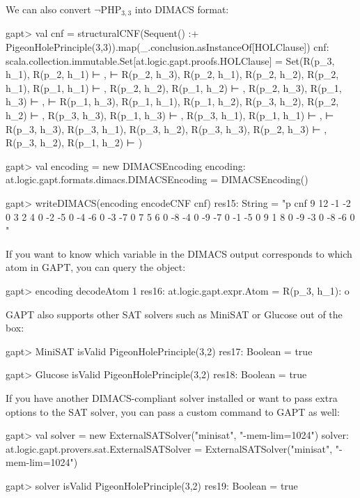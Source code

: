 \documentclass[a4paper,11pt]{article}
\newcommand{\cli}[1]{{\ttfamily {#1}}}
\begin{document}
We can also convert $\neg\mathrm{PHP}_{3,3}$ into DIMACS format:
\begin{clilisting}
gapt> val cnf = structuralCNF(Sequent() :+ PigeonHolePrinciple(3,3)).map(_.conclusion.asInstanceOf[HOLClause])
cnf: scala.collection.immutable.Set[at.logic.gapt.proofs.HOLClause] = Set(R(p_3, h_1), R(p_2, h_1) ⊢ ,  ⊢ R(p_2, h_3), R(p_2, h_1), R(p_2, h_2), R(p_2, h_1), R(p_1, h_1) ⊢ , R(p_2, h_2), R(p_1, h_2) ⊢ , R(p_2, h_3), R(p_1, h_3) ⊢ ,  ⊢ R(p_1, h_3), R(p_1, h_1), R(p_1, h_2), R(p_3, h_2), R(p_2, h_2) ⊢ , R(p_3, h_3), R(p_1, h_3) ⊢ , R(p_3, h_1), R(p_1, h_1) ⊢ ,  ⊢ R(p_3, h_3), R(p_3, h_1), R(p_3, h_2), R(p_3, h_3), R(p_2, h_3) ⊢ , R(p_3, h_2), R(p_1, h_2) ⊢ )

gapt> val encoding = new DIMACSEncoding
encoding: at.logic.gapt.formats.dimacs.DIMACSEncoding = DIMACSEncoding()

gapt> writeDIMACS(encoding encodeCNF cnf)
res15: String =
"p cnf 9 12
-1 -2 0
3 2 4 0
-2 -5 0
-4 -6 0
-3 -7 0
7 5 6 0
-8 -4 0
-9 -7 0
-1 -5 0
9 1 8 0
-9 -3 0
-8 -6 0
"

\end{clilisting}

If you want to know which variable in the DIMACS output corresponds to which
atom in GAPT, you can query the \cli{DIMACSEncoding} object:
\begin{clilisting}
gapt> encoding decodeAtom 1
res16: at.logic.gapt.expr.Atom = R(p_3, h_1): o

\end{clilisting}

GAPT also supports other SAT solvers such as MiniSAT or Glucose out of the box:
\begin{clilisting}
gapt> MiniSAT isValid PigeonHolePrinciple(3,2)
res17: Boolean = true

\end{clilisting}
\begin{clilisting}
gapt> Glucose isValid PigeonHolePrinciple(3,2)
res18: Boolean = true

\end{clilisting}

If you have another DIMACS-compliant solver installed or want to pass extra
options to the SAT solver, you can pass a custom command to GAPT as well:
\begin{clilisting}
gapt> val solver = new ExternalSATSolver("minisat", "-mem-lim=1024")
solver: at.logic.gapt.provers.sat.ExternalSATSolver = ExternalSATSolver("minisat", "-mem-lim=1024")

gapt> solver isValid PigeonHolePrinciple(3,2)
res19: Boolean = true

\end{clilisting}
\end{document}
